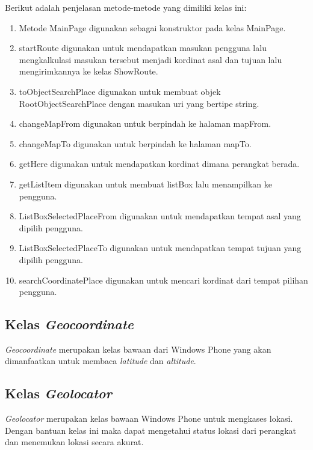 Berikut adalah penjelasan metode-metode yang dimiliki kelas ini:
\begin{enumerate}
	\item Metode MainPage digunakan sebagai konstruktor pada kelas MainPage. 
	\item startRoute digunakan untuk mendapatkan masukan pengguna lalu mengkalkulasi masukan tersebut menjadi kordinat asal dan tujuan lalu mengirimkannya ke kelas ShowRoute.
	\item toObjectSearchPlace digunakan untuk membuat objek RootObjectSearchPlace dengan masukan uri yang bertipe string.
	\item changeMapFrom digunakan untuk berpindah ke halaman mapFrom.
	\item changeMapTo digunakan untuk berpindah ke halaman mapTo.
	\item getHere digunakan untuk mendapatkan kordinat dimana perangkat berada.
	\item getListItem digunakan untuk membuat listBox lalu menampilkan ke pengguna. 
	\item ListBoxSelectedPlaceFrom digunakan untuk mendapatkan tempat asal yang dipilih pengguna.
	\item ListBoxSelectedPlaceTo digunakan untuk mendapatkan tempat tujuan yang dipilih pengguna.
	\item searchCoordinatePlace digunakan untuk mencari kordinat dari tempat pilihan pengguna.
\end{enumerate}

\subsection{Kelas \textit{Geocoordinate}}
\label{lab:Kelas Geocoordinate}
\hspace{0.5cm} \textit{Geocoordinate} merupakan kelas bawaan dari Windows Phone yang akan dimanfaatkan untuk membaca \textit{latitude} dan \textit{altitude}.

\subsection{Kelas \textit{Geolocator}}
\label{lab:Kelas Geolocator}
\hspace{0.5cm} \textit{Geolocator} merupakan kelas bawaan Windows Phone untuk mengkases lokasi. Dengan bantuan kelas ini maka dapat mengetahui status lokasi dari perangkat dan menemukan lokasi secara akurat.

